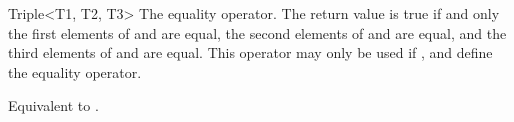 \begin{ccRefClass}{Triple<T1, T2, T3>}
   {The
    equality operator. The return value is true if and only the first
    elements of  and  are equal, the second elements of
     and  are equal, and the third elements of 
    and  are equal.  This operator may only be used if
    ,  and  define the equality operator.}
  
   {Equivalent to
    .}

\end{ccRefClass}



